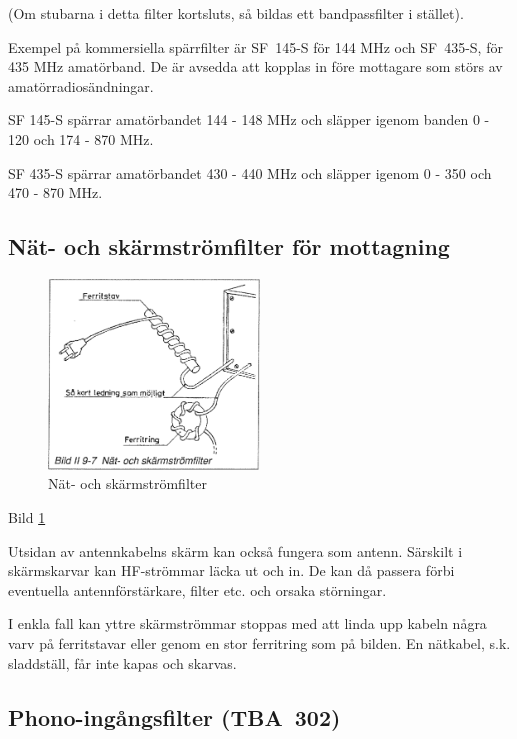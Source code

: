 (Om stubarna i detta filter kortsluts, så bildas ett bandpassfilter i
stället).

Exempel på kommersiella spärrfilter är SF~145-S för 144 MHz och
SF~435-S, för 435 MHz amatörband. De är avsedda att kopplas in före
mottagare som störs av amatörradiosändningar.

SF 145-S spärrar amatörbandet 144 - 148 MHz och släpper igenom banden
0 - 120 och 174 - 870 MHz.

SF 435-S spärrar amatörbandet 430 - 440 MHz och släpper igenom 0 -
350 och 470 - 870 MHz.

\subsection{Nät- och skärmströmfilter för mottagning}

\begin{figure}
  \includegraphics[width=0.5\textwidth]{images/bild_2_9-07}
  \caption{Nät- och skärmströmfilter}
  \label{fig:bildII9-7}
\end{figure}

Bild \ref{fig:bildII9-7}

\begin{rev-omarbetas}
Utsidan av antennkabelns skärm kan också fungera som antenn. Särskilt
i skärmskarvar kan HF-strömmar läcka ut och in. De kan då passera förbi
eventuella antennförstärkare, filter etc. och orsaka störningar.

I enkla fall kan yttre skärmströmmar stoppas med att linda upp kabeln
några varv på ferritstavar eller genom en stor ferritring som på
bilden. En nätkabel, s.k. sladdställ, får inte kapas och skarvas.

\end{rev-omarbetas}

\subsection{Phono-ingångsfilter (TBA~302)}

